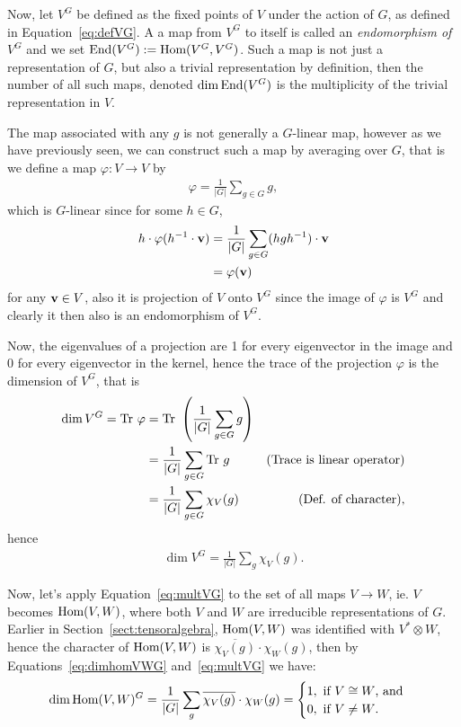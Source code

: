 Now, let $V^G$ be defined as the fixed points of $V$ under the action of $G$, as defined in Equation~\ref{eq:defVG}. A a map from $V^G$ to itself is called an \textit{endomorphism of $V^G$} and we set $\text{End}(V^G) := \text{Hom}(V^G, V^G)$. Such a map is not just a representation of $G$, but also a trivial representation by definition, then the number of all such maps, denoted $\dim \text{End}(V^G)$ is the multiplicity of the trivial representation in $V$. 

The map associated with any $g$ is not generally a $G$-linear map, however as we have previously seen, we can construct such a map by averaging over $G$, that is we define a map $\varphi: V \rightarrow V$ by
\begin{align*}
	\varphi = \frac{1}{|G|} \sum_{g \in G} g,
\end{align*}
which is $G$-linear since for some $h \in G$, \begin{align*}
	h \cdot \varphi(h^{-1} \cdot \mathbf{v}) &= \frac{1}{|G|} \sum_{g \in G} (hgh^{-1}) \cdot \mathbf{v} \\
	&= \varphi(\mathbf{v})
\end{align*} for any $\mathbf{v} \in V$, also it is projection of $V$ onto $V^G$ since the image of $\varphi$ is $V^G$ and clearly it then also is an endomorphism of $V^G$. 

Now, the eigenvalues of a projection are 1 for every eigenvector in the image and 0 for every eigenvector in the kernel, hence the trace of the projection $\varphi$ is the dimension of $V^G$, that is
\begin{align*}
	\dim V^G = \text{Tr } \varphi &= \text{Tr } \left( \frac{1}{|G|} \sum_{g \in G} g \right) \\
	&= \frac{1}{|G|} \sum_{g \in G} \text{Tr } g & \text{(Trace is linear operator)} \\
	&= \frac{1}{|G|} \sum_{g \in G} \chi_{V}(g) & \text{(Def. of character)},
\end{align*}
hence \begin{align}\label{eq:multVG}
	\dim V^G = \frac{1}{|G|} \sum_g \chi_V(g).
\end{align}

Now, let's apply Equation~\ref{eq:multVG} to the set of all maps $V \rightarrow W$, ie. $V$ becomes $\text{Hom} (V,W)$, where both $V$ and $W$ are irreducible representations of $G$. Earlier in Section~\ref{sect:tensoralgebra}, $\text{Hom}(V,W)$ was identified with $V^* \otimes W$, hence the character of $\text{Hom}(V,W)$ is $\overline{\chi_V(g)}\cdot\chi_W(g)$, then by Equations~\ref{eq:dimhomVWG} and~\ref{eq:multVG} we have:
\begin{align*}
	\dim \text{Hom}(V,W)^G = \frac{1}{|G|} \sum_g \overline{\chi_V(g)}\cdot\chi_W(g) = \begin{cases}
		1, \text{ if $V \cong W$, and} \\
		0, \text{ if $V \neq W$.}
	\end{cases}
\end{align*}

